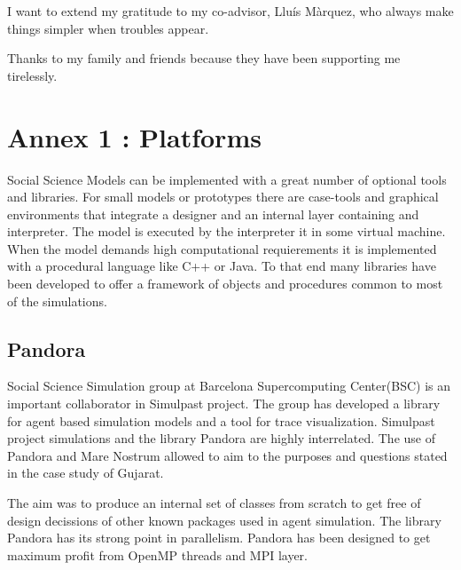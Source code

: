 \documentclass[11pt,oneside,a4paper,openright]{report}
\begin{document}
I want to extend my gratitude to my co-advisor, Llu\'is M\`arquez, who always make things simpler 
when troubles appear.

Thanks to my family and friends because they have been supporting me tirelessly.


\chapter{Annex 1 : Platforms}

Social Science Models can be implemented with a great number of optional tools and libraries.
For small models or prototypes there are case-tools and graphical environments that 
integrate a designer and an internal layer containing and interpreter. The model is executed
by the interpreter it in some virtual machine. When the model demands high computational 
requierements it is implemented with a procedural language like C++ or Java. To that end many 
libraries have been developed to offer a framework of objects and procedures common to most of the simulations.

\section{Pandora}

Social Science Simulation group at Barcelona Supercomputing Center(BSC) is an important collaborator
in Simulpast project. The group has developed a library for agent based simulation models and a tool for 
trace visualization. Simulpast project simulations and the library Pandora are highly interrelated. The use 
of Pandora and Mare Nostrum allowed to aim to the purposes and questions stated in the case study of Gujarat.

The aim was to produce an internal set of classes from scratch to get free of design decissions of other known packages used in agent simulation. The library Pandora has its strong point in parallelism. Pandora has been designed to get maximum profit from OpenMP threads and MPI layer. 
\end{document}
